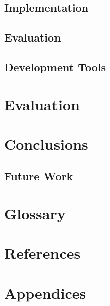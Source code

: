 \documentclass{article}
\begin{document}
\section{Implementation}
\section{Evaluation}
\section{Development Tools}

\chapter{Evaluation}


\chapter{Conclusions}
\section{Future Work}

\chapter{Glossary}

\chapter{References}

\chapter{Appendices}
\end{document}
